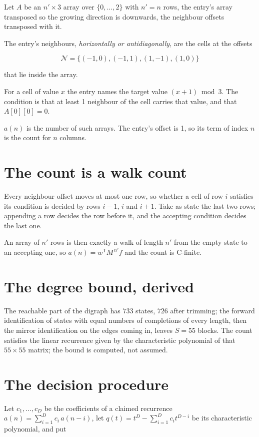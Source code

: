\documentclass[11pt]{article}
\theoremstyle{definition}
\begin{document}
Let $A$ be an $n' \times 3$ array over $\{0,\dots,2\}$ with $n' = n$ rows, the entry's array transposed so the growing direction is downwards, the neighbour offsets transposed with it.

The entry's neighbours, {\itshape horizontally or antidiagonally}, are the cells at the offsets

\[\mathcal{N} = \{(-1,0), (-1,1), (1,-1), (1,0)\}\]

that lie inside the array.

For a cell of value $x$ the entry names the target value $(x + 1) \bmod 3$. The condition is that at least 1 neighbour of the cell carries that value, and that $A[0][0] = 0$.

$a(n)$ is the number of such arrays. The entry's offset is 1, so its term of index $n$ is the count for $n$ columns.

\section{The count is a walk count}

Every neighbour offset moves at most one row, so whether a cell of row $i$ satisfies its condition is decided by rows $i-1$, $i$ and $i+1$. Take as state the last two rows; appending a row decides the row before it, and the accepting condition decides the last one.

An array of $n'$ rows is then exactly a walk of length $n'$ from the empty state to an accepting one, so $a(n) = w^{\mathsf T}M^{\,n'}f$ and the count is C-finite.

\section{The degree bound, derived}

The reachable part of the digraph has $733$ states, $726$ after trimming; the forward identification of states with equal numbers of completions of every length, then the mirror identification on the edges coming in, leaves $S = 55$ blocks. The count satisfies the linear recurrence given by the characteristic polynomial of that $55\times55$ matrix; the bound is computed, not assumed.

\section{The decision procedure}

Let $c_1,\dots,c_D$ be the coefficients of a claimed recurrence $a(n) = \sum_{i=1}^{D} c_i\,a(n-i)$, let $q(t) = t^{D} - \sum_{i=1}^{D} c_i t^{D-i}$ be its characteristic polynomial, and put
\end{document}
